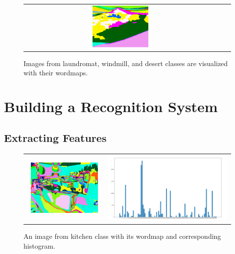 \documentclass[a4paper]{article}
\begin{document}
\begin{figure}[!ht]
\begin{tabular}{ccc}
{\includegraphics[width=0.3\textwidth]{desert_wordmap}} \\
\end{tabular}
\caption{Images from laundromat, windmill, and desert classes are visualized with their wordmaps.}
\end{figure}

\section{Building a Recognition System}
\subsection{Extracting Features}

\begin{figure}[!ht]
\centering
\begin{tabular}{c}
{\includegraphics[width=0.9\textwidth]{kitchen}} &
{\includegraphics[width=\textwidth]{kitchen_hist}} \\
\end{tabular}
\caption{An image from kitchen class with its wordmap and corresponding histogram.}
\end{figure}
\end{document}
